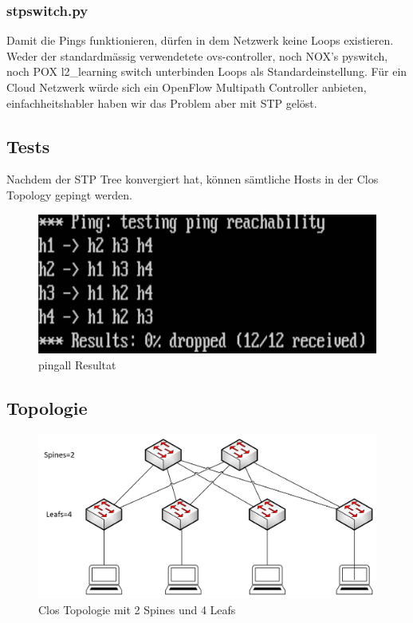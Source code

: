 \subsubsection{stpswitch.py}
Damit die Pings funktionieren, dürfen in dem Netzwerk keine Loops existieren. Weder der standardmässig verwendetete ovs-controller, noch NOX's pyswitch, noch POX l2\_learning switch unterbinden Loops als Standardeinstellung. Für ein Cloud Netzwerk würde sich ein OpenFlow Multipath Controller anbieten, einfachheitshabler haben wir das Problem aber mit STP gelöst. 


\subsection{Tests}
Nachdem der STP Tree konvergiert hat, können sämtliche Hosts in der Clos Topology gepingt werden.
\begin{figure}[h]
\centering
\includegraphics[width=0.7\linewidth]{images/ping_result}
\caption{pingall Resultat}
\label{fig:pingresult}
\end{figure}

\clearpage

\subsection{Topologie}
\begin{figure}[h]
	\centering
	\includegraphics[width=0.9\linewidth]{images/scheme}
	\caption{Clos Topologie mit 2 Spines und 4 Leafs}
	\label{fig:scheme}
\end{figure}





